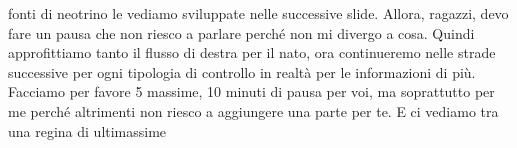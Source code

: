 fonti di neotrino le vediamo sviluppate nelle successive slide. Allora, ragazzi, devo fare un pausa che non riesco a parlare perché non mi divergo a cosa. Quindi approfittiamo tanto il flusso di destra per il nato, ora continueremo nelle strade successive per ogni tipologia di controllo in realtà per le informazioni di più. Facciamo per favore 5 massime, 10 minuti di pausa per voi, ma soprattutto per me perché altrimenti non riesco a aggiungere una parte per te. E ci vediamo tra una regina di ultimassime